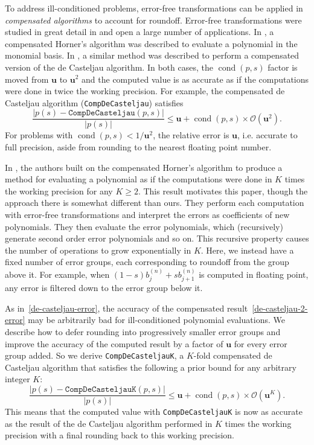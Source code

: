 \documentclass[letterpaper,10pt]{article}
\newcommand{\cond}[1]{\operatorname{cond}\left(#1\right)}
\newcommand{\mach}{\mathbf{u}}
\begin{document}
To address ill-conditioned problems, error-free transformations can
be applied in \textit{compensated algorithms} to account for roundoff.
Error-free transformations were studied in great detail in \cite{Ogita2005}
and open a large number of applications.
In \cite{langlois_et_al:DSP:2006:442}, a compensated Horner's algorithm was
described to evaluate a polynomial in the monomial basis. In \cite{Jiang2010},
a similar method was described to perform a compensated version of the de
Casteljau algorithm. In both cases, the \(\cond{p, s}\) factor is moved
from \(\mach\) to \(\mach^2\) and the computed value is as accurate
as if the computations were done in twice the working precision. For example,
the compensated de Casteljau algorithm (\texttt{CompDeCasteljau}) satisfies
\begin{equation}\label{de-casteljau-2-error}
  \frac{\left|p(s) - \mathtt{CompDeCasteljau}(p, s)\right|}{
    \left|p(s)\right|} \leq \mach + \cond{p, s} \times
    \mathcal{O}\left(\mach^2\right).
\end{equation}
For problems with \(\cond{p, s} < 1 / \mach^2\), the relative error
is \(\mach\), i.e. accurate to full precision, aside from rounding to the
nearest floating point number.

In \cite{Graillat2009}, the authors built on the compensated Horner's
algorithm to produce a method for evaluating a polynomial as if
the computations were done in \(K\) times the working precision for
any \(K \geq 2\). This result motivates this paper, though the
approach there is somewhat different than ours. They perform each computation
with error-free transformations and interpret the errors as coefficients of new
polynomials. They then evaluate the error polynomials, which (recursively)
generate second order error polynomials and so on. This recursive property
causes the number of operations to grow exponentially in \(K\). Here, we
instead have a fixed number of error groups, each corresponding to roundoff
from the group above it. For example, when
\((1 - s) b_j^{(n)} + s b_{j + 1}^{(n)}\) is computed in floating point, any
error is filtered down to the error group below it.

As in~\eqref{de-casteljau-error}, the accuracy of the compensated
result~\eqref{de-casteljau-2-error} may be arbitrarily bad for ill-conditioned
polynomial evaluations. We describe how to defer rounding into progressively
smaller error groups and improve the accuracy of the computed result by a
factor of \(\mach\) for every error group added. So we derive
\texttt{CompDeCasteljauK}, a \(K\)-fold compensated de Casteljau algorithm
that satisfies the following a prior bound for any arbitrary integer \(K\):
\begin{equation}
  \frac{\left|p(s) - \mathtt{CompDeCasteljauK}(p, s)\right|}{
    \left|p(s)\right|} \leq \mach + \cond{p, s} \times
    \mathcal{O}\left(\mach^K\right).
\end{equation}
This means that the computed value with \texttt{CompDeCasteljauK} is now
as accurate as the result of the de Casteljau algorithm performed in
\(K\) times the working precision with a final rounding back to this
working precision.
\end{document}

